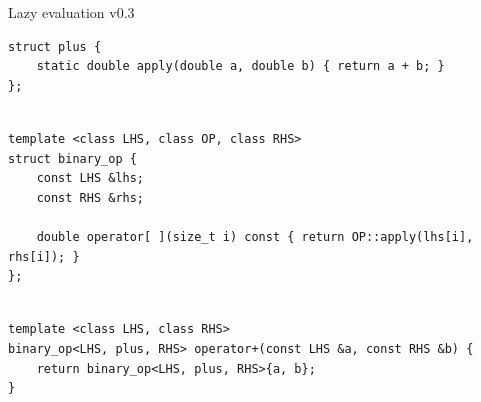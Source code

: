 \documentclass[@BEAMER_OPTIONS@]{beamer}
\begin{document}
\note{ }

\begin{frame}[fragile]{Lazy evaluation v0.3}
    \begin{exampleblock}{}
        \begin{lstlisting}
struct plus {
    static double apply(double a, double b) { return a + b; }
};
        \end{lstlisting}
        \pause
        \begin{lstlisting}[firstnumber=last]

template <class LHS, class OP, class RHS>
struct binary_op {
    const LHS &lhs;
    const RHS &rhs;

    double operator[ ](size_t i) const { return OP::apply(lhs[i], rhs[i]); }
};
        \end{lstlisting}
        \pause
        \begin{lstlisting}[firstnumber=last]

template <class LHS, class RHS>
binary_op<LHS, plus, RHS> operator+(const LHS &a, const RHS &b) {
    return binary_op<LHS, plus, RHS>{a, b};
}
        \end{lstlisting}
    \end{exampleblock}
\end{frame}

\note{ }
\end{document}
